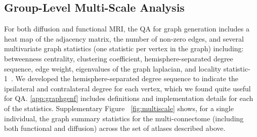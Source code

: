 \documentclass[11pt]{article}
\begin{document}



\subsection{Group-Level Multi-Scale Analysis}

For both diffusion and functional MRI, the QA for graph generation includes a heat map of the adjacency matrix, the number of non-zero edges, and several multivariate graph statistics (one statistic per vertex in the graph) including:  betweenness centrality, clustering coefficient, hemisphere-separated degree sequence, edge weight, eigenvalues of the graph laplacian, and locality statistic-1~\cite{glocal}.
We developed the hemisphere-separated degree sequence to indicate the ipsilateral and contralateral degree for each vertex, which we found quite useful for QA.  
\ref{app:graphgenf} includes definitions and implementation details for each of the statistics.
Supplementary Figure ~\ref{fig:multiscale} shows, for a single individual, the graph summary statistics for the multi-connectome (including both functional and diffusion) across the set of atlases described above.


% 




\end{document}
